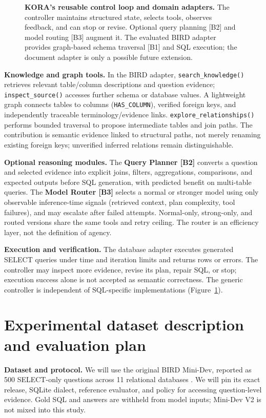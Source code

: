 \documentclass{article}
\begin{document}
\begin{figure}[H]
\centering

\caption{\textbf{KORA's reusable control loop and domain adapters.} The controller maintains structured state, selects tools, observes feedback, and can stop or revise. Optional query planning [B2] and model routing [B3] augment it. The evaluated BIRD adapter provides graph-based schema traversal [B1] and SQL execution; the document adapter is only a possible future extension.}
\label{fig:kora-architecture}
\end{figure}

\textbf{Knowledge and graph tools.} In the BIRD adapter, \texttt{search\_knowledge()} retrieves relevant table/column descriptions and question evidence; \texttt{inspect\_source()} accesses further schema or database values. A lightweight graph connects tables to columns (\texttt{HAS\_COLUMN}), verified foreign keys, and independently traceable terminology/evidence links. \texttt{explore\_relationships()} performs bounded traversal to propose intermediate tables and join paths. The contribution is semantic evidence linked to structural paths, not merely renaming existing foreign keys; unverified inferred relations remain distinguishable.

\textbf{Optional reasoning modules.} The \textbf{Query Planner [B2]} converts a question and selected evidence into explicit joins, filters, aggregations, comparisons, and expected outputs before SQL generation, with predicted benefit on multi-table queries. The \textbf{Model Router [B3]} selects a normal or stronger model using only observable inference-time signals (retrieved context, plan complexity, tool failures), and may escalate after failed attempts. Normal-only, strong-only, and routed versions share the same tools and retry ceiling. The router is an efficiency layer, not the definition of agency.

\textbf{Execution and verification.} The database adapter executes generated SELECT queries under time and iteration limits and returns rows or errors. The controller may inspect more evidence, revise its plan, repair SQL, or stop; execution success alone is not accepted as semantic correctness. The generic controller is independent of SQL-specific implementations (Figure~\ref{fig:kora-architecture}).

\section{Experimental dataset description and evaluation plan}
\textbf{Dataset and protocol.} We will use the original BIRD Mini-Dev, reported as 500 SELECT-only questions across 11 relational databases \citep{birdmini2025}. We will pin its exact release, SQLite dialect, reference evaluator, and policy for accessing question-level evidence. Gold SQL and answers are withheld from model inputs; Mini-Dev V2 is not mixed into this study.
\end{document}
